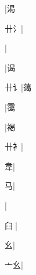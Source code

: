 \begin{multicols}{2}
{{}|{\cjk{}渴}\par
{\cjk{}{\cnsym{}　}卄{\cnxHanaA{}氵}}|{}\par
{}|{}\par
{}|{\cjk{}谒}\par
{\cjk{}{\cnsym{}　}卄{讠}}|{\cjk{}蔼}\par
{}|{\cjk{}霭}\par
{}|{\cjk{}褐}\par
{\cjk{}{\cnsym{}　}卄{衤}}|{}\par
{\cjk{}{\cnsym{}　}{\cnsym{}　}韋}|{}\par
{\cjk{}{\cnsym{}　}{\cnsym{}　}马}|{}\par
{}|{}\par
{\cjk{}{\cnsym{}　}臼{\cnjzr{}}}|{}\par
{\cjk{}{\cnsym{}　}{\cnsym{}　}幺}|{}\par
{\cjk{}{\cnsym{}　}亠幺}|{}\par
}
\end{multicols}
